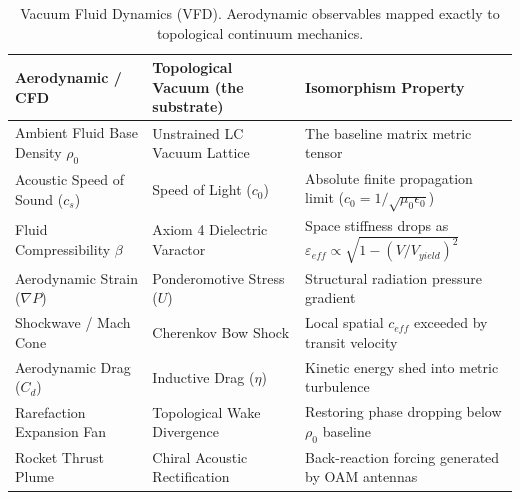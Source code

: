 %

\begin{table}[H]
\centering
\caption{Vacuum Fluid Dynamics (VFD). Aerodynamic observables mapped exactly to topological continuum mechanics.}
\label{tab:trans_fluidics}
\small
\renewcommand{\arraystretch}{1.3}
\begin{tabularx}{\textwidth}{@{}l X X@{}}
\toprule
\textbf{Aerodynamic / CFD} & \textbf{Topological Vacuum (the substrate)} & \textbf{Isomorphism Property} \\
\midrule
Ambient Fluid Base Density $\rho_0$ & Unstrained LC Vacuum Lattice & The baseline matrix metric tensor \\
Acoustic Speed of Sound ($c_s$)   & Speed of Light ($c_0$)       & Absolute finite propagation limit ($c_0 = 1/\sqrt{\mu_0\epsilon_0}$) \\
Fluid Compressibility $\beta$     & Axiom 4 Dielectric Varactor  & Space stiffness drops as $\varepsilon_{eff} \propto \sqrt{1 - (V/V_{yield})^2}$ \\
Aerodynamic Strain ($\nabla P$)   & Ponderomotive Stress ($U$)   & Structural radiation pressure gradient \\
Shockwave / Mach Cone            & Cherenkov Bow Shock          & Local spatial $c_{eff}$ exceeded by transit velocity \\
Aerodynamic Drag ($C_d$)         & Inductive Drag ($\eta$)      & Kinetic energy shed into metric turbulence \\
Rarefaction Expansion Fan         & Topological Wake Divergence  & Restoring phase dropping below $\rho_0$ baseline \\
Rocket Thrust Plume               & Chiral Acoustic Rectification& Back-reaction forcing generated by OAM antennas \\
\bottomrule
\end{tabularx}
\end{table}
